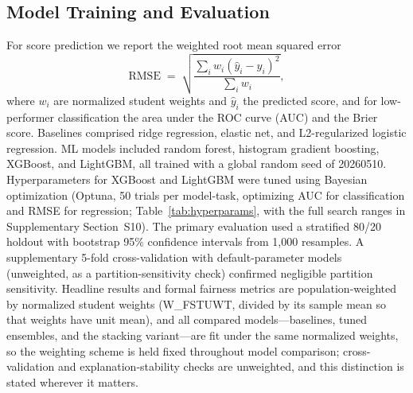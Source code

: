 \documentclass[journal]{IEEEtran}
\begin{document}
\subsection{Model Training and Evaluation}
For score prediction we report the weighted root mean squared error
\begin{equation}
\mathrm{RMSE} \;=\; \sqrt{\frac{\sum_i w_i (\hat{y}_i - y_i)^2}{\sum_i w_i}},
\label{eq:rmse}
\end{equation}
where $w_i$ are normalized student weights and $\hat{y}_i$ the predicted score, and for low-performer classification the area under the ROC curve (AUC) and the Brier score. Baselines comprised ridge regression, elastic net, and L2-regularized logistic regression. ML models included random forest, histogram gradient boosting, XGBoost, and LightGBM, all trained with a global random seed of 20260510. Hyperparameters for XGBoost and LightGBM were tuned using Bayesian optimization (Optuna, 50 trials per model-task, optimizing AUC for classification and RMSE for regression; Table~\ref{tab:hyperparams}, with the full search ranges in Supplementary Section~S10). The primary evaluation used a stratified 80/20 holdout with bootstrap 95\% confidence intervals from 1,000 resamples. A supplementary 5-fold cross-validation with default-parameter models (unweighted, as a partition-sensitivity check) confirmed negligible partition sensitivity. Headline results and formal fairness metrics are population-weighted by normalized student weights (W\_FSTUWT, divided by its sample mean so that weights have unit mean), and all compared models---baselines, tuned ensembles, and the stacking variant---are fit under the same normalized weights, so the weighting scheme is held fixed throughout model comparison; cross-validation and explanation-stability checks are unweighted, and this distinction is stated wherever it matters.
\end{document}
